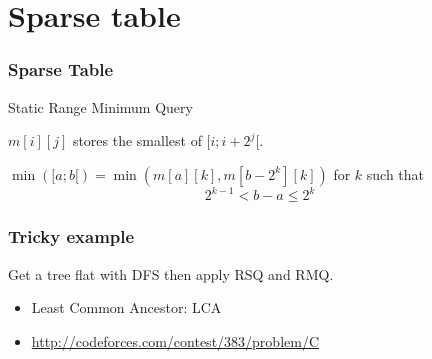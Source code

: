 \documentclass[10pt,svgnames,usenames,table]{beamer} %
\begin{document}
\section{Sparse table}
\begin{frame}
  \frametitle{Sparse Table}
  Static Range Minimum Query

  $m[i][j]$ stores the smallest of $[i;i+2^j[$.

  $\min([a; b[) = \min(m[a][k], m[b-2^k][k])$ for $k$ such that
  $$2^{k-1} < b-a \leq 2^k$$
\end{frame}

\begin{frame}
  \frametitle{Tricky example}
  Get a tree flat with DFS then apply RSQ and RMQ.
  \begin{itemize}
    \item Least Common Ancestor: LCA
    \item \url{http://codeforces.com/contest/383/problem/C}
  \end{itemize}
\end{frame}
\end{document}
